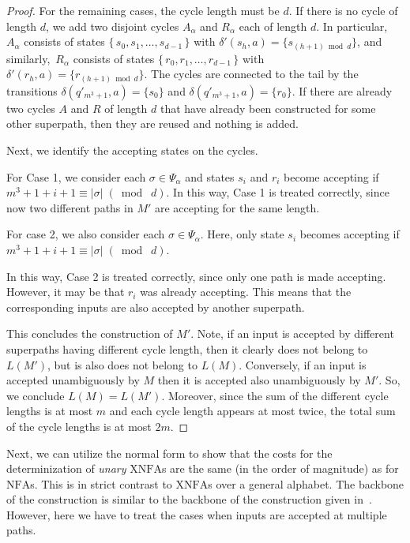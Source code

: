 \documentclass[final,copyright,noderivs]{eptcs}
\theoremstyle{plain}
\theoremstyle{definition}
\newcommand{\nfa}{\textrm{NFA}}
\newcommand{\xnfa}{\textrm{XNFA}}
\begin{document}
\begin{proof}
\begin{sloppypar}
For the remaining cases, the cycle length must be $d$. 
If there is no cycle of length $d$, we add two disjoint
cycles $A_\alpha$ and $R_\alpha$ each of length $d$.
In particular, $A_\alpha$ consists of states 
$\{\, s_{0}, s_{1},\dots ,s_{d-1}\,\}$ with 
$\delta'(s_{h},a)=\{s_{(h+1)\bmod d}\}$, and similarly,~$R_\alpha$ consists of states 
$\{\, r_{0}, r_{1},\dots ,r_{d-1}\,\}$ with 
\mbox{$\delta'(r_{h},a)=\{r_{(h+1)\bmod d}\}$.} The cycles
are connected to the tail by the transitions
$\delta(q'_{m^3+1},a)=\{s_{0}\}$ and
$\delta(q'_{m^3+1},a)=\{r_{0}\}$.
If there are already two cycles 
$A$ and $R$ of length $d$ that have already been constructed
for some other superpath, then they are reused
and nothing is added.
\end{sloppypar}

Next, we identify the accepting states on the cycles.

For Case 1, we consider each $\sigma\in \Psi_\alpha$
and states $s_i$ and $r_i$ become accepting if 
$m^3+1+i+1 \equiv |\sigma|\; (\bmod\; d)$.
In this way, Case 1 is treated correctly, since
now two different paths in $M'$ are accepting 
for the same length.

For case 2, we also consider each $\sigma\in 
\Psi_\alpha$. Here, only state $s_i$ becomes accepting if 
$m^3+1+i+1 \equiv |\sigma|\; (\bmod\; d)$.

In this way, Case 2 is treated correctly, since
only one path is made accepting. However, it
may be that $r_i$ was already accepting. This means that
the corresponding inputs are also accepted by another
superpath.

This concludes the construction of $M'$. Note, if an input is
accepted by different superpaths having different cycle length,
then it clearly does not belong to~$L(M')$, but is also does 
not belong to $L(M)$. Conversely, if an input is accepted
unambiguously by $M$ then it is accepted also unambiguously
by $M'$. So, we conclude $L(M)=L(M')$. Moreover, since the sum
of the different cycle lengths is at most $m$ and each cycle length
appears at most twice, the total sum of the cycle lengths is at most $2m$. 
\end{proof}


Next, we can utilize the normal form to show that the costs for the
determinization of \emph{unary} $\xnfa$s are the same (in the order 
of magnitude) as for $\nfa$s. This is in strict contrast to $\xnfa$s
over a general alphabet. 
The backbone of the construction is similar to the backbone of the
construction given in~\cite{Chrobak:1986:FAUL}. However, here we 
have to treat the cases when inputs are accepted at multiple paths.
\end{document}
